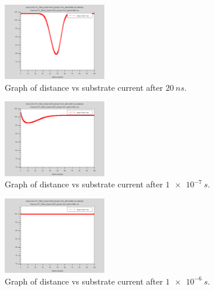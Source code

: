 \documentclass[12pt]{article}
\begin{document}
\begin{figure}[H]
  \centering
  \includegraphics[width=0.4\textwidth]{PC_100um_Nsub1e+015_density1.0e-3_after2e-008s}
  \caption{Graph of distance vs substrate current after $\SI{20}{ns}$.}
  \label{fig:density1.0e-3_after2e-008s}
\end{figure}
\begin{figure}[H]
  \centering
  \includegraphics[width=0.4\textwidth]{PC_100um_Nsub1e+015_density1.0e-3_after1e-007s}
  \caption{Graph of distance vs substrate current after $\SI{1e-7}{s}$.}
  \label{fig:density1.0e-3_after1.0e-1-007s}
\end{figure}
\begin{figure}[H]
  \centering
  \includegraphics[width=0.4\textwidth]{PC_100um_Nsub1e+015_density1.0e-3_after1e-006s}
  \caption{Graph of distance vs substrate current after $\SI{1e-6}{s}$.}
  \label{fig:density1.0e-3_after1.0e-1-006s}
\end{figure}
\end{document}

